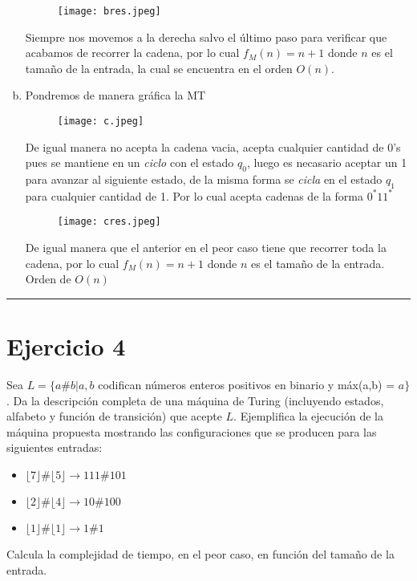 \documentclass[12pt,letterpaper]{article}
\newcommand{\lineaxd}{{\color{brown}\rule{\linewidth}{0.5mm}}}
\begin{document}
\begin{enumerate}[a.]
    \begin{figure}[htb]
        \centering
        \texttt{[image: bres.jpeg]}
    \end{figure}
    
    Siempre nos movemos a la derecha salvo el último paso para verificar que acabamos de recorrer la cadena, por lo cual $f_M(n)=n+1$ donde $n$ es el tamaño de la entrada, la cual se encuentra en el orden $O(n)$.
    
    \item Pondremos de manera gráfica la MT
    \begin{figure}[htb]
        \centering
        \texttt{[image: c.jpeg]}
    \end{figure}
    \newpage
    De igual manera no acepta la cadena vacia, acepta cualquier cantidad de 0's pues se mantiene en un \textit{ciclo} con el estado $q_0$, luego es necasario aceptar un 1 para avanzar al siguiente estado, de la misma forma se \textit{cicla} en el estado $q_1$ para cualquier cantidad de 1. Por lo cual acepta cadenas de la forma $0^*11^*$
    
    \begin{figure}[htb]
        \centering
        \texttt{[image: cres.jpeg]}
    \end{figure}
    
    De igual manera que el anterior en el peor caso tiene que recorrer toda la cadena, por lo cual 
    $f_M(n)=n+1$ donde $n$ es el tamaño de la entrada. Orden de $O(n)$
\end{enumerate}
    
\lineaxd

\section*{Ejercicio 4}
Sea $L = \{a\#b | a, b$ codifican números enteros positivos en binario y máx(a,b) = $a \}$. Da la descripción completa de una máquina de Turing (incluyendo estados, alfabeto y función de transición) que acepte $L$. Ejemplifica la ejecución de la máquina propuesta mostrando las configuraciones que se producen para las siguientes entradas:

\begin{itemize}
    \item $\lfloor 7 \rfloor \# \lfloor 5 \rfloor \longrightarrow 111 \# 101$
    
    \item $\lfloor 2 \rfloor \# \lfloor 4 \rfloor \longrightarrow 10 \# 100$
    
    \item $\lfloor 1 \rfloor \# \lfloor 1 \rfloor \longrightarrow 1 \# 1$
\end{itemize}
Calcula la complejidad de tiempo, en el peor caso, en función del tamaño de la entrada.
\end{document}
